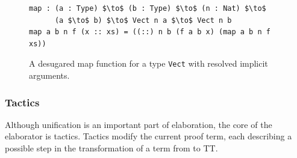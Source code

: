 \begin{figure}
\begin{lstlisting}[mathescape]
map : (a : Type) $\to$ (b : Type) $\to$ (n : Nat) $\to$ 
      (a $\to$ b) $\to$ Vect n a $\to$ Vect n b
map a b n f (x :: xs) = ((::) n b (f a b x) (map a b n f xs))
\end{lstlisting}
  \caption{A desugared map function for a type \texttt{Vect} with resolved
    implicit arguments.}
  \label{fig:vect_map_resolved}
\end{figure}

\subsubsection{Tactics}
Although unification is an important part of elaboration, the core of the
elaborator is tactics. Tactics modify the current proof term, each describing a
possible step in the transformation of a term from \IdrisM{} to TT. 




